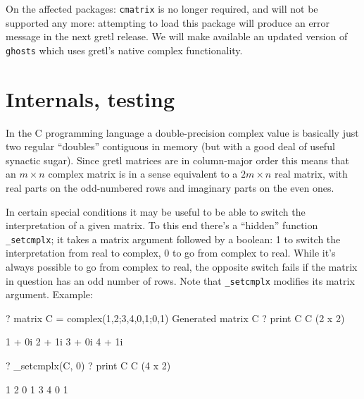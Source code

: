 \documentclass{article}
\begin{document}
On the affected packages: \texttt{cmatrix} is no longer required, and
will not be supported any more: attempting to load this package will
produce an error message in the next gretl release. We will make
available an updated version of \texttt{ghosts} which uses gretl's
native complex functionality.

\section{Internals, testing}

In the \textsf{C} programming language a double-precision complex
value is basically just two regular ``doubles'' contiguous in memory
(but with a good deal of useful synactic sugar). Since gretl matrices
are in column-major order this means that an $m \times n$ complex
matrix is in a sense equivalent to a $2m \times n$ real matrix, with
real parts on the odd-numbered rows and imaginary parts on the even
ones.

In certain special conditions it may be useful to be able to switch
the interpretation of a given matrix. To this end there's a ``hidden''
function \verb|_setcmplx|; it takes a matrix argument followed by a
boolean: 1 to switch the interpretation from real to complex, 0 to go
from complex to real. While it's always possible to go from complex to
real, the opposite switch fails if the matrix in question has an odd
number of rows. Note that \verb|_setcmplx| modifies its matrix
argument. Example:
\begin{code}
? matrix C = complex({1,2;3,4},{0,1;0,1})
Generated matrix C
? print C
C (2 x 2)

 1 + 0i   2 + 1i
 3 + 0i   4 + 1i

? _setcmplx(C, 0)
? print C
C (4 x 2)

  1   2
  0   1
  3   4
  0   1
\end{code}
\end{document}
